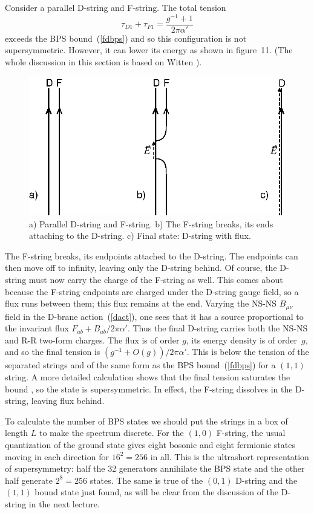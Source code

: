 \documentclass[12pt]{article}
\def\be{\begin{equation}}
\def\ee{\end{equation}}
\def\ap{\alpha'}
\def\apm{\alpha'}
\begin{document}
Consider a parallel D-string and F-string.  The total
tension
\be
\tau_{D1} + \tau_{F1} = \frac{g^{-1} + 1}{ 2\pi\apm}
\ee 
exceeds the BPS
bound~(\ref{fdbps}) and so this configuration is not supersymmetric.  However,
it can lower its energy as shown in figure~11.  (The whole discussion in
this section is based on Witten \cite{witbound}).
\begin{figure}
\begin{center}
\leavevmode
\includegraphics{fdbound.eps}
\end{center}
\caption[]{a) Parallel D-string and F-string.  b) The F-string breaks, its
ends attaching to the D-string.  c) Final state: D-string with flux.}
\end{figure}
The F-string breaks, its endpoints attached to the D-string.  The endpoints
can then move off to infinity, leaving only the D-string behind.  Of course,
the D-string must now carry the charge of the F-string as well.  This comes
about because the F-string endpoints are charged under the D-string gauge
field, so a flux runs between them; this flux remains at the end.  Varying the
NS-NS $B_{\mu\nu}$ field in the D-brane action~(\ref{dact}), one sees that it
has a source proportional to the invariant flux $F_{ab} + B_{ab} / 2\pi\ap$. 
Thus the final D-string carries both the NS-NS and R-R two-form charges.  The
flux is of order $g$, its energy density is of order~$g$, and
so the final tension is $(g^{-1} + O(g))/2\pi\apm$.  This is below the tension
of the separated strings and of the same form as the BPS bound~(\ref{fdbps})
for a $(1,1)$ string.  A more detailed calculation shows that the final
tension saturates the bound \cite{rract}, so the state is supersymmetric.  In
effect, the F-string dissolves in the D-string, leaving flux behind.

To calculate the number of BPS states we should put the strings in a box of
length $L$ to make the spectrum discrete.  For the $(1,0)$ F-string, the usual
quantization of the ground state gives eight bosonic and eight fermionic
states moving in each direction for $16^2 = 256$ in all.  This is the
ultrashort representation of supersymmetry: half the 32 generators
annihilate the BPS state and the other half generate $2^8 = 256$ states.  The
same is true of the $(0,1)$ D-string and the $(1,1)$ bound state just found,
as will be clear from the discussion of the D-string in the next lecture.
\end{document}
